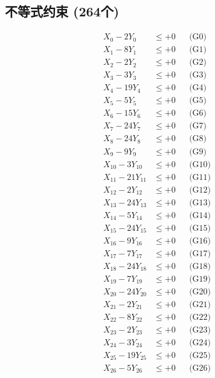 \documentclass[a4paper,10pt]{article}
\begin{document}
\subsection{不等式约束 (264个)}

\allowdisplaybreaks
{\small
\begin{align}
\allowbreak
X_{0} - 2Y_{0} &\leq +0 && \text{(G0)} \\
X_{1} - 8Y_{1} &\leq +0 && \text{(G1)} \\
X_{2} - 2Y_{2} &\leq +0 && \text{(G2)} \\
X_{3} - 3Y_{3} &\leq +0 && \text{(G3)} \\
X_{4} - 19Y_{4} &\leq +0 && \text{(G4)} \\
X_{5} - 5Y_{5} &\leq +0 && \text{(G5)} \\
X_{6} - 15Y_{6} &\leq +0 && \text{(G6)} \\
X_{7} - 24Y_{7} &\leq +0 && \text{(G7)} \\
\allowbreak
X_{8} - 24Y_{8} &\leq +0 && \text{(G8)} \\
X_{9} - 9Y_{9} &\leq +0 && \text{(G9)} \\
X_{10} - 3Y_{10} &\leq +0 && \text{(G10)} \\
X_{11} - 21Y_{11} &\leq +0 && \text{(G11)} \\
X_{12} - 2Y_{12} &\leq +0 && \text{(G12)} \\
X_{13} - 24Y_{13} &\leq +0 && \text{(G13)} \\
X_{14} - 5Y_{14} &\leq +0 && \text{(G14)} \\
X_{15} - 24Y_{15} &\leq +0 && \text{(G15)} \\
X_{16} - 9Y_{16} &\leq +0 && \text{(G16)} \\
X_{17} - 7Y_{17} &\leq +0 && \text{(G17)} \\
\allowbreak
X_{18} - 24Y_{18} &\leq +0 && \text{(G18)} \\
X_{19} - 7Y_{19} &\leq +0 && \text{(G19)} \\
X_{20} - 24Y_{20} &\leq +0 && \text{(G20)} \\
X_{21} - 2Y_{21} &\leq +0 && \text{(G21)} \\
X_{22} - 8Y_{22} &\leq +0 && \text{(G22)} \\
X_{23} - 2Y_{23} &\leq +0 && \text{(G23)} \\
X_{24} - 3Y_{24} &\leq +0 && \text{(G24)} \\
X_{25} - 19Y_{25} &\leq +0 && \text{(G25)} \\
X_{26} - 5Y_{26} &\leq +0 && \text{(G26)} \\

\end{align}}
\end{document}
